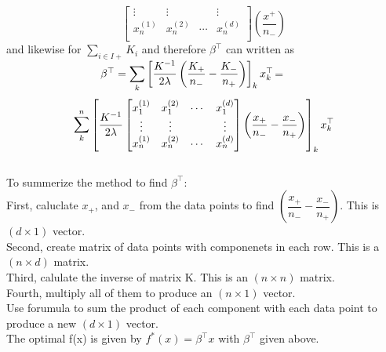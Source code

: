 \documentclass[18pt]{article}
\begin{document}
\begin{flushleft}
$$\begin{bmatrix}
        \vdots    & \vdots    &        &\vdots\\
        x_n^{(1)} & x_n^{(2)}& \cdots &x_n^{(d)}\\
    \end{bmatrix}  \left(\dfrac{x^+}{n_-}\right)
$$
\vspace{.4cm}
and likewise for $\sum\limits_{i \in I+} K_i$ and therefore $\beta^{\top}$ can written as\\
\vspace{.4cm}
$\hspace{3cm} \beta^{\top}=\mathlarger\sum\limits_{k} \left[ \dfrac{K^{-1}}{2 \lambda}\left(\dfrac{K_+}{n_{-}}-\dfrac{K_-}{n_{+}}\right)\right]_k x_k^{\top}$=\\

\vspace{.4cm}
$$
\mathlarger\sum\limits_{k}^n \left[ \dfrac{K^{-1}}{2 \lambda}
\begin{bmatrix}
    x_1^{(1)} & x_1^{(2)}& \cdots &x_1^{(d)}\\
    \vdots    & \vdots    &        &\vdots\\
    x_n^{(1)} & x_n^{(2)}& \cdots &x_n^{(d)}
\end{bmatrix}  \left(\dfrac{x_+}{n_-}-\dfrac{x_-}{n_+}\right)\right]_k x_k^{\top}
$$\\
\vspace{.4cm}
To summerize the method to find $\beta^{\top}$:\\
\vspace{.4cm}
First, caluclate $x_+$, and $x_-$ from the data points to find $\left(\dfrac{x_+}{n_-}-\dfrac{x_-}{n_+}\right)$. This is $(d\times1)$ vector.\\
\vspace{.4cm}
Second, create matrix of data points with componenets in each row. This is a $(n \times d)$ matrix.\\
\vspace{.4cm}
Third, calulate the inverse of matrix K. This is an $(n \times n)$ matrix.\\
\vspace{.4cm}
Fourth, multiply all of them to produce an $(n \times 1)$ vector.\\
\vspace{.4cm}
Use forumula to sum the product of each component with each data point to produce a new $(d \times 1)$ vector.\\
\vspace{.4cm}
The optimal f(x) is given by $f^*(x)=\beta^{\top}x$ with $\beta^{\top}$ given above.

\end{flushleft}
\end{document}
